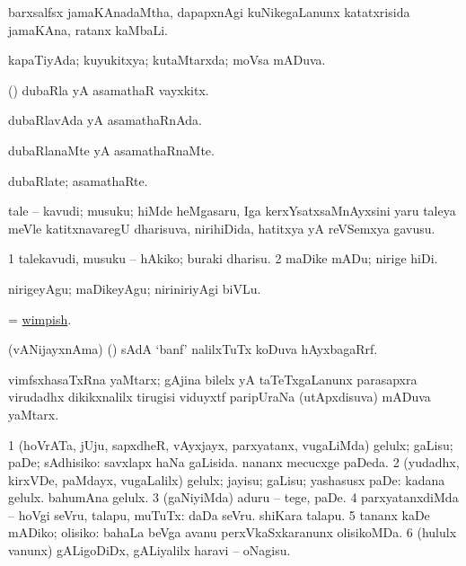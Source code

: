 \bentry
{}
\gl{\nA}
\bmng
barxsalfsx jamaKAnadaMtha, dapapxnAgi kuNikegaLanunx katatxrisida jamaKAna, ratanx kaMbaLi. 
\emng
\eentry

\bentry
{}
\gl{\saMkiSx}
\bmng
{} 
\emng
\eentry

\bentry
{}
\gl{\gu} 
\bmng
kapaTiyAda; kuyukitxya; kutaMtarxda; moVsa mADuva. 
\emng
\eentry

\bentry
{}
\gl{\nA}
\bmng
(\AmA) dubaRla yA asamathaR vayxkitx. 
\emng
\eentry

\bentry
{}
\gl{\gu}
\bmng
dubaRlavAda yA asamathaRnAda. 
\emng
\eentry

\bentry
{}
\gl{\kirxvi}
\bmng
dubaRlanaMte yA asamathaRnaMte. 
\emng
\eentry

\bentry
{}
\gl{\nA}
\bmng
dubaRlate; asamathaRte. 
\emng
\eentry

\bentry
{} 
\gl{\nA}
\expl{}
\bmng
tale -- kavudi; musuku; hiMde heMgasaru, Iga kerxYsatxsaMnAyxsini yaru taleya meVle katitxnavaregU dharisuva, nirihiDida, hatitxya yA reVSemxya gavusu. 
\emng
\eentry

\bentry
{} 
\gl{\sakirx}
\expl{}
\bmng
\bnum
\num{1} talekavudi, musuku -- hAkiko; buraki dharisu. 
\num{2} maDike mADu; nirige hiDi. 
\enum
\emng

\noindent 
\gl{\akirx}
\expl{}
\bmng
nirigeyAgu; maDikeyAgu; niriniriyAgi biVLu. 
\emng
\eentry

\bentry
{} 
\gl{\gu}
\expl{}
\bmng
= \hyperlink{wimpish}{wimpish}. 
\emng
\eentry

\bentry
{} 
\gl{\nA}
\bmng
(vANijayxnAma) (\AmA) sAdA `banf' nalilxTuTx koDuva hAyxbagaRrf. 
\emng
\eentry

\bentry
{} 
\gl{\nA}
\bmng
vimfsxhasaTxRna yaMtarx; gAjina bilelx yA taTeTxgaLanunx parasapxra virudadhx dikikxnalilx tirugisi viduyxtf paripUraNa (utApxdisuva) mADuva yaMtarx. 
\emng
\eentry

\bentry
{} 
\gl{\sakirx}
\expl{}
\bmng
\bnum
\num{1} (hoVrATa, jUju, sapxdheR, vAyxjayx, parxyatanx, \mo vugaLiMda) gelulx; gaLisu; paDe; sAdhisiko:  savxlapx haNa gaLisida.  nananx mecucxge paDeda. 
\num{2} (yudadhx, kirxVDe, paMdayx, \mo vugaLalilx) gelulx; jayisu; gaLisu; yashasusx paDe:  kadana gelulx.  bahumAna gelulx. 
\num{3} (gaNiyiMda) aduru -- tege, paDe. 
\num{4} parxyatanxdiMda -- hoVgi seVru, talapu, muTuTx:  daDa seVru.  shiKara talapu. 
\num{5} tananx kaDe mADiko; olisiko:  bahaLa beVga avanu perxVkaSxkaranunx olisikoMDa. 
\num{6} (hululx \mo vanunx) gALigoDiDx, gALiyalilx haravi -- oNagisu. 
\enum
\emng

